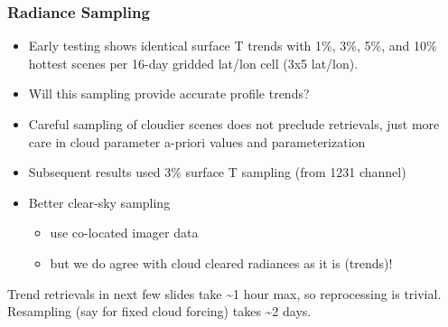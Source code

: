 \documentclass[10pt,t]{beamer}
\begin{document}
\begin{frame}
\frametitle{Radiance Sampling}  
\begin{itemize}
\item Early testing shows identical surface T trends with 1\%, 3\%, 5\%, and 10\% hottest scenes per 16-day gridded lat/lon cell (3x5 lat/lon).
\item Will this sampling provide accurate profile trends?
\item Careful sampling of cloudier scenes does not preclude retrievals, just more care in cloud parameter a-priori values and parameterization
\item Subsequent results used 3\% surface T sampling (from 1231 \wn channel)
\item Better clear-sky sampling
  \begin{itemize}
    \item use co-located imager data
    \item but we do agree with cloud cleared radiances as it is (trends)!
  \end{itemize}

\vspace{0.1in}
\end{itemize}

Trend retrievals in next few slides take \textasciitilde{}1 hour max, so reprocessing is trivial.\\
  \vspace{0.1in}
Resampling (say for fixed cloud forcing) takes \textasciitilde{}2 days.  
\end{frame}
\end{document}

